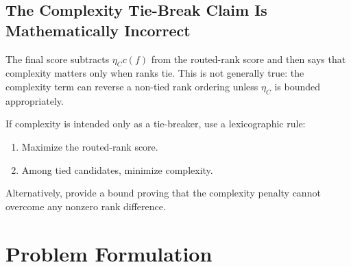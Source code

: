 \documentclass[11pt]{article}
\begin{document}
\subsection{The Complexity Tie-Break Claim Is Mathematically Incorrect}

The final score subtracts $\eta_Cc(f)$ from the routed-rank score and then says
that complexity matters only when ranks tie. This is not generally true: the
complexity term can reverse a non-tied rank ordering unless $\eta_C$ is bounded
appropriately.

If complexity is intended only as a tie-breaker, use a lexicographic rule:

\begin{enumerate}
  \item Maximize the routed-rank score.
  \item Among tied candidates, minimize complexity.
\end{enumerate}

Alternatively, provide a bound proving that the complexity penalty cannot
overcome any nonzero rank difference.

\section{Problem Formulation}
\end{document}
